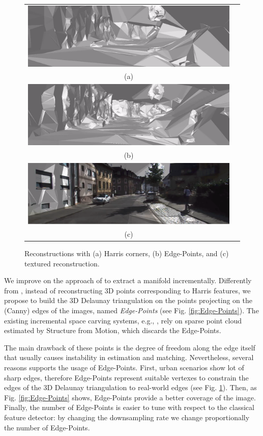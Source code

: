 \begin{figure}
\centering
\begin{tabular}{cc}
\includegraphics[width=0.75\columnwidth]{./img//reconstrHarris}\\
(a)\\
\includegraphics[width=0.75\columnwidth]{./img//reconstr}\\
(b)\\
\includegraphics[width=0.75\columnwidth]{./img//reconstrTex}\\
(c)\\
\end{tabular}
\caption{Reconstructions with (a) Harris corners, (b) Edge-Points, and (c) textured reconstruction.}
\label{fig:recons}
\end{figure}

We improve on the approach of \cite{litvinov_lhuillier_13} to extract a manifold incrementally. 
Differently from \cite{litvinov_lhuillier_13}, instead of reconstructing 3D points corresponding to Harris features, we propose to build the 3D Delaunay triangulation on the points projecting on the (Canny) edges of the images, named \emph{Edge-Points} (see Fig. \ref{fig:Edge-Points}). 
The existing incremental space carving systems, e.g., \cite{litvinov_Lhiuller14, litvinov_lhuillier_13, Lovi_et_al_11}, rely on sparse point cloud estimated by Structure from Motion, which discards the Edge-Points.

The main drawback of these points is the degree of freedom along the edge itself that usually causes instability in estimation and matching.
Nevertheless, several reasons supports the usage of Edge-Points.
First, urban scenarios show lot of sharp edges, therefore Edge-Points represent suitable vertexes to constrain the edges of the 3D Delaunay triangulation to real-world edges (see Fig. \ref{fig:recons}). 
Then, as Fig. \ref{fig:Edge-Points} shows, Edge-Points provide a better coverage of the image.
Finally, the number of Edge-Points is easier to tune with respect to the classical feature detector: by changing the downsampling rate we change proportionally the number of Edge-Points.

